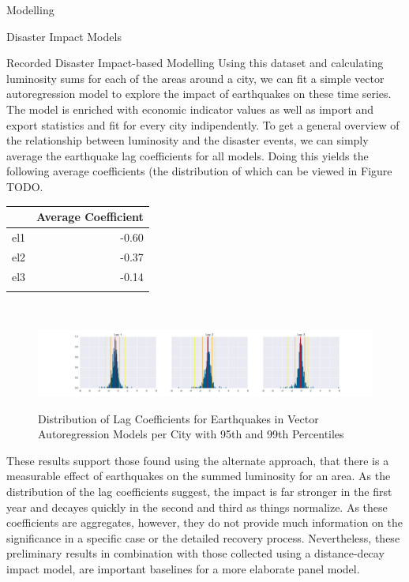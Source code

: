 \documentclass[12pt,fleqn,leqno,letterpaper]{article}
\begin{document}
\begin{section}{Modelling}
\begin{subsection}{Disaster Impact Models}
\begin{subsubsection}{Recorded Disaster Impact-based Modelling}
      Using this dataset and calculating luminosity sums for each of the areas around a city, we can fit a simple vector autoregression model to explore the impact of earthquakes on these time series. The model is enriched with economic indicator values as well as import and export statistics and fit for every city indipendently. To get a general overview of the relationship between luminosity and the disaster events, we can simply average the earthquake lag coefficients for all models. Doing this yields the following average coefficients (the distribution of which can be viewed in Figure TODO.\\
      \begin{center}
        \begin{tabular}{lr}\\
          \toprule
          {} & Average Coefficient \\
          \midrule
          el1 & -0.60 \\
          el2 & -0.37 \\
          el3 & -0.14 \\
          \bottomrule\\
        \end{tabular}\\
      \end{center}
      \begin{figure}
        \centering
        \includegraphics[width=\linewidth]{non_balanced_earthquake_coefficients_distribution}\label{fig:non_balanced_earthquake_coefficients_distribution} %
        \caption{Distribution of Lag Coefficients for Earthquakes in Vector Autoregression Models per City with 95th and 99th Percentiles}
      \end{figure}
      These results support those found using the alternate approach, that there is a measurable effect of earthquakes on the summed luminosity for an area. As the distribution of the lag coefficients suggest, the impact is far stronger in the first year and decayes quickly in the second and third as things normalize. As these coefficients are aggregates, however, they do not provide much information on the significance in a specific case or the detailed recovery process. Nevertheless, these preliminary results in combination with those collected using a distance-decay impact model, are important baselines for a more elaborate panel model.\\

\end{subsubsection}
\end{subsection}
\end{section}
\end{document}
